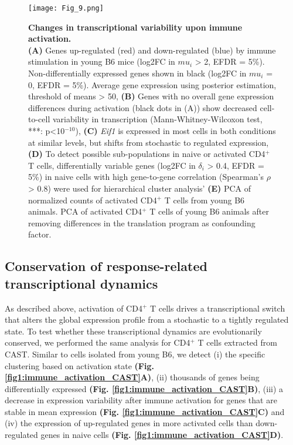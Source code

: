 \begin{figure}[!ht]
\centering
\texttt{[image: Fig\_9.png]}
\caption[Changes in transcriptional variability upon immune activation]{\textbf{Changes in transcriptional variability upon immune activation.}\\
\textbf{(A)} Genes up-regulated (red) and down-regulated (blue) by immune stimulation in young B6 mice (log2FC in $mu_i$ > 2, EFDR = 5\%). Non-differentially expressed genes shown in black (log2FC in $mu_i$ = 0, EFDR = 5\%). Average gene expression using posterior estimation, threshold of means > 50, \textbf{(B)} Genes with no overall gene expression differences during activation (black dots in (A)) show decreased cell-to-cell variability in transcription (Mann-Whitney-Wilcoxon test, ***: p<10$^{-10}$), \textbf{(C)} \textit{Eif1} is expressed in most cells in both conditions at similar levels, but shifts from stochastic to regulated expression, \textbf{(D)} To detect possible sub-populations in naive or activated CD4$^+$ T cells, differentially variable genes (log2FC in $\delta_i$ > 0.4, EFDR = 5\%) in naive cells with high gene-to-gene correlation (Spearman’s $\rho$ > 0.8) were used for hierarchical cluster analysis' \textbf{(E)} PCA of normalized counts of activated CD4$^+$ T cells from young B6 animals. PCA of activated CD4$^+$ T cells of young B6 animals after removing differences in the translation program as confounding factor.}
\label{fig1:immune_variability}
\end{figure}

\newpage


\subsection{Conservation of response-related transcriptional dynamics }

As described above, activation of CD4$^+$ T cells drives a transcriptional switch that alters the global expression profile from a stochastic to a tightly regulated state. To test whether these transcriptional dynamics are evolutionarily conserved, we performed the same analysis for CD4$^+$ T cells extracted from CAST. Similar to cells isolated from young B6, we detect (i) the specific clustering based on activation state \textbf{(Fig. \ref{fig1:immune_activation_CAST}A)}, (ii)  thousands of genes being differentially expressed \textbf{(Fig. \ref{fig1:immune_activation_CAST}B)}, (iii) a decrease in expression variability after immune activation for genes that are stable in mean expression \textbf{(Fig. \ref{fig1:immune_activation_CAST}C)} and (iv) the expression of up-regulated genes in more activated cells than down-regulated genes in naive cells \textbf{(Fig. \ref{fig1:immune_activation_CAST}D)}.

